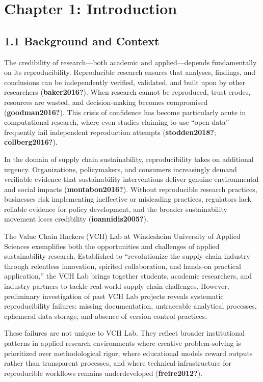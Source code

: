 \documentclass[
  oneside,
  open=any]{scrbook}
\begin{document}
\newpage

\chapter{Chapter 1: Introduction}\label{chapter-1-introduction}

\section{1.1 Background and Context}\label{background-and-context}

The credibility of research---both academic and applied---depends
fundamentally on its reproducibility. Reproducible research ensures that
analyses, findings, and conclusions can be independently verified,
validated, and built upon by other researchers (\textbf{baker2016?}).
When research cannot be reproduced, trust erodes, resources are wasted,
and decision-making becomes compromised (\textbf{goodman2016?}). This
crisis of confidence has become particularly acute in computational
research, where even studies claiming to use ``open data'' frequently
fail independent reproduction attempts (\textbf{stodden2018?};
\textbf{collberg2016?}).

In the domain of supply chain sustainability, reproducibility takes on
additional urgency. Organizations, policymakers, and consumers
increasingly demand verifiable evidence that sustainability
interventions deliver genuine environmental and social impacts
(\textbf{montabon2016?}). Without reproducible research practices,
businesses risk implementing ineffective or misleading practices,
regulators lack reliable evidence for policy development, and the
broader sustainability movement loses credibility
(\textbf{ioannidis2005?}).

The Value Chain Hackers (VCH) Lab at Windesheim University of Applied
Sciences exemplifies both the opportunities and challenges of applied
sustainability research. Established to ``revolutionize the supply chain
industry through relentless innovation, spirited collaboration, and
hands-on practical application,'' the VCH Lab brings together students,
academic researchers, and industry partners to tackle real-world supply
chain challenges. However, preliminary investigation of past VCH Lab
projects reveals systematic reproducibility failures: missing
documentation, untraceable analytical processes, ephemeral data storage,
and absence of version control practices.

These failures are not unique to VCH Lab. They reflect broader
institutional patterns in applied research environments where creative
problem-solving is prioritized over methodological rigor, where
educational models reward outputs rather than transparent processes, and
where technical infrastructure for reproducible workflows remains
underdeveloped (\textbf{freire2012?}).
\end{document}
